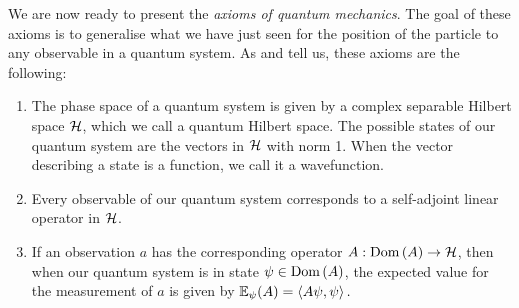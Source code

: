 \medskip

We are now ready to present the {\emph{axioms of quantum mechanics}}. The goal of these axioms is to generalise what we have just seen for the position of the particle to any observable in a quantum system. As {\cite[p.57]{teschl}} and {\cite[Chapter 3.6]{Hall2013}} tell us, these axioms are the following:
\begin{enumerate}[label=(QM\arabic*)]
  \item The phase space of a quantum system is given by a complex separable Hilbert space $\mathcal{H}$, which we call a quantum Hilbert space. The possible states of our quantum system are the vectors in $\mathcal{H}$ with norm 1. When the vector describing a state is a function, we call it a {wavefunction}.
  \item Every observable of our quantum system corresponds to a self-adjoint linear operator in $\mathcal{H}$.
  \item If an observation $a$ has the corresponding operator $A: \operatorname{Dom}\left(A\right) \to \mathcal{H}$, then when our quantum system is in state $\psi \in \operatorname{Dom}\left(A\right)$, the expected value for the measurement of $a$ is given by \(
    \mathbb{E}_\psi (A) = \left\langle A \psi, \psi\right\rangle.
  \)
\end{enumerate}

